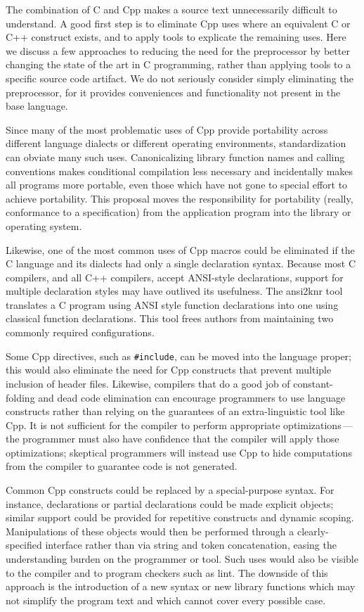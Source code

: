 \documentclass[10pt]{article}
\begin{document}
The combination of C and Cpp makes a source text unnecessarily difficult
to understand.  A good first step is to eliminate Cpp uses where an
equivalent C or C++ construct exists, and to apply tools to explicate
the remaining uses.  Here we discuss a few approaches to reducing the
need for the preprocessor by better changing the state of the art in C
programming, rather than applying tools to a specific source code
artifact.  We do not seriously consider simply eliminating the
preprocessor, for it provides conveniences and functionality not present
in the base language.

Since many of the most problematic uses of Cpp provide portability across
different language dialects or different operating environments,
standardization can obviate many such uses.  Canonicalizing library
function names and calling conventions makes conditional compilation less
necessary and incidentally makes all programs more portable, even those
which have not gone to special effort to achieve portability.  This
proposal moves the responsibility for portability (really, conformance to a
specification) from the application program into the library or operating
system.  

Likewise, one of the most common uses of Cpp macros could be eliminated if
the C language and its dialects had only a single declaration syntax.
Because most C compilers, and all C++ compilers, accept ANSI-style
declarations, support for multiple declaration styles may have outlived its
usefulness.  The ansi2knr tool~\cite{Deutsch90} translates a C program
using ANSI style function declarations into one using classical function
declarations.  This tool frees authors from maintaining two commonly
required configurations.

Some Cpp directives, such as {\tt \#include}, can be moved into the
language proper; this would also eliminate the need for Cpp constructs
that prevent multiple inclusion of header files.  Likewise, compilers
that do a good job of constant-folding and dead code elimination can
encourage programmers to use language constructs rather than relying on
the guarantees of an extra-linguistic tool like Cpp.  It is not
sufficient for the compiler to perform appropriate
optimizations\,---\,the programmer must also have confidence that the
compiler will apply those optimizations; skeptical programmers will
instead use Cpp to hide computations from the compiler to 
guarantee code is not generated.

Common Cpp constructs could be replaced by a special-purpose syntax.  For
instance, declarations or partial declarations could be made explicit
objects; similar support could be provided for repetitive constructs and
dynamic scoping.  Manipulations of these objects would then be performed
through a clearly-specified interface rather than via string and token
concatenation, easing the understanding burden on the programmer or tool.
Such uses would also be visible to the compiler and to program checkers
such as lint.  The downside of this approach is the introduction of a new
syntax or new library functions which may not simplify the program text and
which cannot cover every possible case.
\end{document}
